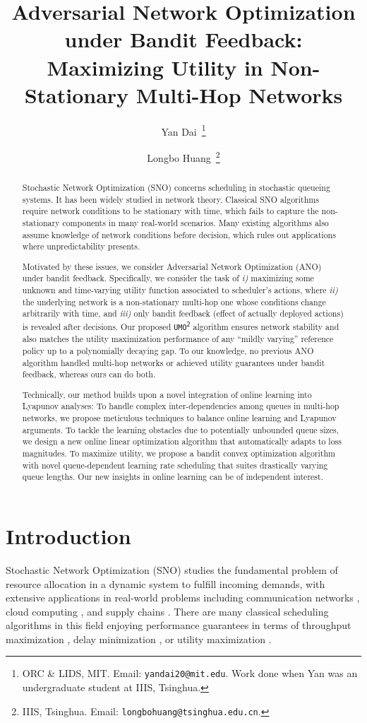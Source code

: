 \documentclass[11pt,fullpage,letterpaper]{article} %
\title{Adversarial Network Optimization under Bandit Feedback: \\ Maximizing Utility in Non-Stationary Multi-Hop Networks}
\author{%
    Yan Dai~\thanks{ORC \& LIDS, MIT. Email: \texttt{yandai20@mit.edu}. Work done when Yan was an undergraduate student at IIIS, Tsinghua.}\and Longbo Huang~\thanks{IIIS, Tsinghua. Email: \texttt{longbohuang@tsinghua.edu.cn}.}
}
\date{}
\newcommand{\UMAlg}{\texttt{UMO}\textsuperscript{\texttt{2}}\xspace}
\begin{document}
\maketitle

\begin{abstract}
Stochastic Network Optimization (SNO) concerns scheduling in stochastic queueing systems. It has been widely studied in network theory.
Classical SNO algorithms require network conditions to be stationary with time, which fails to capture the non-stationary components in many real-world scenarios. Many existing algorithms also assume knowledge of network conditions before decision, which rules out applications where unpredictability presents.

Motivated by these issues, we consider Adversarial Network Optimization (ANO) under bandit feedback.
Specifically, we consider the task of \textit{i)} maximizing some unknown and time-varying utility function associated to scheduler's actions, where \textit{ii)} the underlying network is a non-stationary multi-hop one whose conditions change arbitrarily with time, and \textit{iii)} only bandit feedback (effect of actually deployed actions) is revealed after decisions.
Our proposed \UMAlg algorithm ensures network stability and also matches the utility maximization performance of any ``mildly varying'' reference policy up to a polynomially decaying gap.
To our knowledge, no previous ANO algorithm handled multi-hop networks or achieved utility guarantees under bandit feedback, whereas ours can do both.

Technically, our method builds upon a novel integration of online learning into Lyapunov analyses:
To handle complex inter-dependencies among queues in multi-hop networks, we propose meticulous techniques to balance online learning and Lyapunov arguments.
To tackle the learning obstacles due to potentially unbounded queue sizes, we design a new online linear optimization algorithm that automatically adapts to loss magnitudes.
To maximize utility, we propose a bandit convex optimization algorithm with novel queue-dependent learning rate scheduling that suites drastically varying queue lengths.
Our new insights in online learning can be of independent interest.
\end{abstract}

\section{Introduction}
Stochastic Network Optimization (SNO) studies the fundamental problem of resource allocation in a dynamic system to fulfill incoming demands, with extensive applications in real-world problems including communication networks \citep{srikant2013communication}, cloud computing \citep{maguluri2012stochastic}, and supply chains \citep{rahdar2018tri}.
There are many classical scheduling algorithms in this field enjoying performance guarantees in terms of throughput maximization \citep{tsibonis2003exploiting}, delay minimization \citep{neely2008order}, or utility maximization \citep{huang2011utility}.
\end{document}

